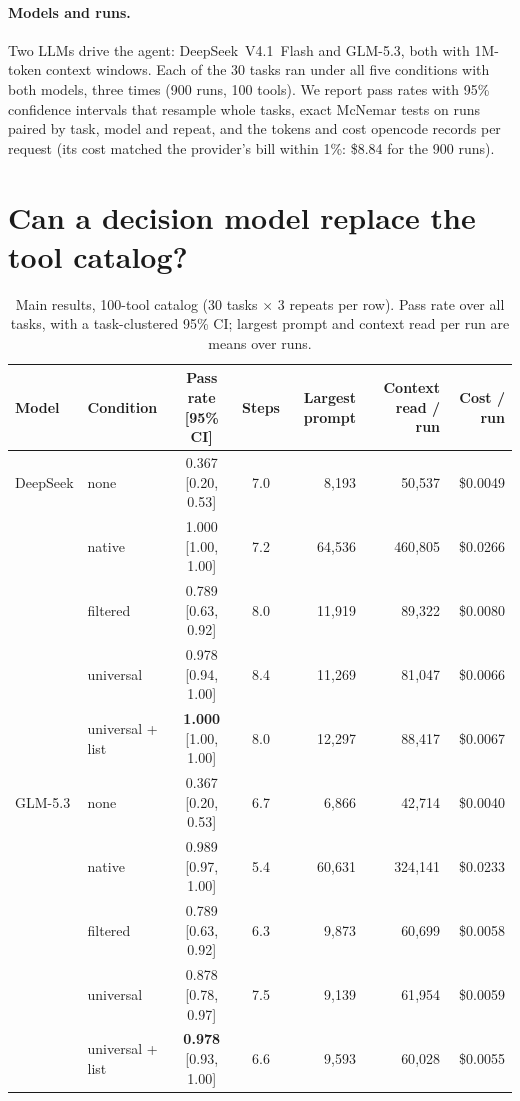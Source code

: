 \paragraph{Models and runs.} Two LLMs drive the agent: DeepSeek~V4.1~Flash and GLM-5.3, both with 1M-token
context windows. Each of the 30 tasks ran under all five conditions with both models, three times (900 runs,
100 tools). We report pass rates with 95\% confidence intervals that resample whole tasks, exact McNemar tests
on runs paired by task, model and repeat, and the tokens and cost opencode records per request (its cost
matched the provider's bill within 1\%: \$8.84 for the 900 runs).

\section{Can a decision model replace the tool catalog?}\label{sec:catalog}
\begin{table}[t]
\centering\small
\caption{Main results, 100-tool catalog (30 tasks $\times$ 3 repeats per row). Pass rate over all tasks, with a
task-clustered 95\% CI; largest prompt and context read per run are means over runs.}
\label{tab:main}
\setlength{\tabcolsep}{4pt}
\begin{tabular}{@{}llccrrr@{}}
\toprule
Model & Condition & Pass rate [95\% CI] & Steps & Largest prompt & Context read / run & Cost / run \\
\midrule
DeepSeek & none & 0.367 [0.20, 0.53] & 7.0 & 8{,}193 & 50{,}537 & \$0.0049 \\
 & native & 1.000 [1.00, 1.00] & 7.2 & 64{,}536 & 460{,}805 & \$0.0266 \\
 & filtered & 0.789 [0.63, 0.92] & 8.0 & 11{,}919 & 89{,}322 & \$0.0080 \\
 & universal & 0.978 [0.94, 1.00] & 8.4 & 11{,}269 & 81{,}047 & \$0.0066 \\
 & universal + list & \textbf{1.000} [1.00, 1.00] & 8.0 & 12{,}297 & 88{,}417 & \$0.0067 \\
\midrule
GLM-5.3 & none & 0.367 [0.20, 0.53] & 6.7 & 6{,}866 & 42{,}714 & \$0.0040 \\
 & native & 0.989 [0.97, 1.00] & 5.4 & 60{,}631 & 324{,}141 & \$0.0233 \\
 & filtered & 0.789 [0.63, 0.92] & 6.3 & 9{,}873 & 60{,}699 & \$0.0058 \\
 & universal & 0.878 [0.78, 0.97] & 7.5 & 9{,}139 & 61{,}954 & \$0.0059 \\
 & universal + list & \textbf{0.978} [0.93, 1.00] & 6.6 & 9{,}593 & 60{,}028 & \$0.0055 \\
\bottomrule
\end{tabular}
\end{table}


